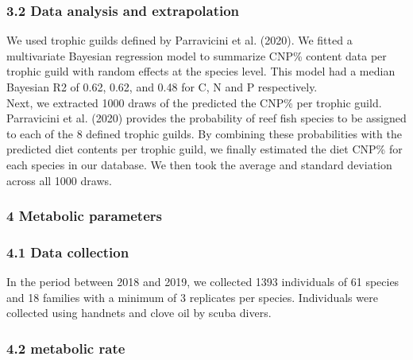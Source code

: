 \documentclass[12pt,a4paper]{article}
\begin{document}
\hypertarget{data-analysis-and-extrapolation-2}{%
\subsubsection{3.2 Data analysis and
extrapolation}\label{data-analysis-and-extrapolation-2}}

\noindent We used trophic guilds defined by Parravicini et al. (2020).
We fitted a multivariate Bayesian regression model to summarize CNP\%
content data per trophic guild with random effects at the species level.
This model had a median Bayesian R2 of 0.62, 0.62, and 0.48 for C, N and
P respectively.\\
Next, we extracted 1000 draws of the predicted the CNP\% per trophic
guild. Parravicini et al. (2020) provides the probability of reef fish
species to be assigned to each of the 8 defined trophic guilds. By
combining these probabilities with the predicted diet contents per
trophic guild, we finally estimated the diet CNP\% for each species in
our database. We then took the average and standard deviation across all
1000 draws.

\hypertarget{metabolic-parameters}{%
\subsubsection{4 Metabolic parameters}\label{metabolic-parameters}}

\hypertarget{data-collection-2}{%
\subsubsection{4.1 Data collection}\label{data-collection-2}}

In the period between 2018 and 2019, we collected 1393 individuals of 61
species and 18 families with a minimum of 3 replicates per species.
Individuals were collected using handnets and clove oil by scuba divers.

\hypertarget{metabolic-rate}{%
\subsubsection{4.2 metabolic rate}\label{metabolic-rate}}
\end{document}
